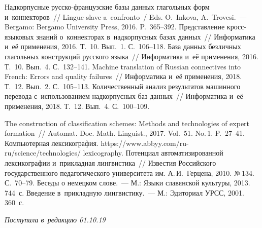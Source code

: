 \begin{multicols}{2}
{{\begin{thebibliography}{99}
 Надкорпусные рус\-ско-фран\-цуз\-ские базы 
данных глагольных форм и~коннекторов~// Lingue slave a~confronto~/ Eds. O.~Inkova, 
A.~Trovesi.~--- Bergamo: Bergamo University Press, 2016. P.~365--392.
 Представление 
кросс-языковых знаний о~коннекторах в~надкорпусных базах данных~// 
Информатика и~её 
применения, 2016. Т.~10. Вып.~1. С.~106--118.
База данных безличных глагольных конструкций 
русского языка~// Информатика и~её применения, 2016. Т.~10. Вып.~4. С.~132--141.
 Machine translation of Russian connectives into 
French: Errors and quality failures~// Информатика и~её применения, 2018. Т.~12. Вып.~2.  
С.~105--113.
 Количественный 
анализ результатов машинного перевода с~использованием надкорпусных баз данных~// 
Информатика и~её применения, 2018. Т.~12. Вып.~4. С.~100--109.


 The construction of classification schemes: 
Methods and technologies of expert formation~// Automat. Doc. Math. Linguist., 
2017. Vol.~51. No.\,1. P.~27--41.
 Компьютерная лексикография. {\sf  
https://www.abbyy.com/ru-ru/science/technologies/ lexicography}.
 Потенциал автоматизированной лексикографии и~прикладная 
лингвистика~// Известия Российского государственного педагогического университета 
им. А.\,И.~Герцена, 2010. №\,134. С.~70--79.
 Беседы о немецком слове.~--- М.: Языки славянской культуры, 
2013. 744~с.
 Введение в~прикладную лингвистику.~--- М.: 
Эдиториал УРСС, 2001. 360~с.
 \end{thebibliography}

 }
 }

\end{multicols}

\vspace*{-9pt}

\hfill{\small\textit{Поступила в~редакцию 01.10.19}}

\vspace*{6pt}


